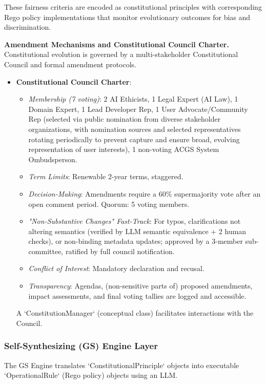 \documentclass[sigconf,natbib]{acmart}
\begin{document}
These fairness criteria are encoded as constitutional principles with corresponding Rego policy implementations that monitor evolutionary outcomes for bias and discrimination.

\textbf{Amendment Mechanisms and Constitutional Council Charter.} Constitutional evolution is governed by a multi-stakeholder Constitutional Council and formal amendment protocols.
\begin{itemize}
    \item \textbf{Constitutional Council Charter}:
    \begin{itemize}
        \item \textit{Membership (7 voting)}: 2 AI Ethicists, 1 Legal Expert (AI Law), 1 Domain Expert, 1 Lead Developer Rep, 1 User Advocate/Community Rep (selected via public nomination from diverse stakeholder organizations, with nomination sources and selected representatives rotating periodically to prevent capture and ensure broad, evolving representation of user interests), 1 non-voting ACGS System Ombudsperson.
        \item \textit{Term Limits}: Renewable 2-year terms, staggered.
        \item \textit{Decision-Making}: Amendments require a 60\% supermajority vote after an open comment period. Quorum: 5 voting members.
        \item \textit{"Non-Substantive Changes" Fast-Track}: For typos, clarifications not altering semantics (verified by LLM semantic equivalence + 2 human checks), or non-binding metadata updates; approved by a 3-member sub-committee, ratified by full council notification.
        \item \textit{Conflict of Interest}: Mandatory declaration and recusal.
        \item \textit{Transparency}: Agendas, (non-sensitive parts of) proposed amendments, impact assessments, and final voting tallies are logged and accessible.
    \end{itemize}
    A `ConstitutionManager` (conceptual class) facilitates interactions with the Council.
\end{itemize}

\subsubsection{Self-Synthesizing (GS) Engine Layer}
The GS Engine translates `ConstitutionalPrinciple` objects into executable `OperationalRule` (Rego policy) objects using an LLM.
\end{document}
